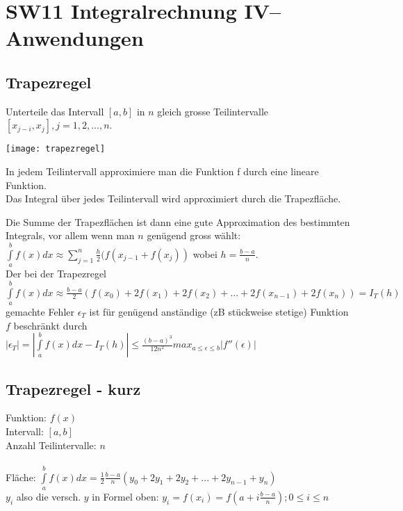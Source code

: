 \documentclass[../main.tex]{subfiles}
\begin{document}
\chapter{SW11 Integralrechnung IV-- Anwendungen}
\section{Trapezregel}
Unterteile das Intervall $[a,b]$ in $n$ gleich grosse Teilintervalle $[x_{j-i},x_j],j=1,2,...,n$.\\
\begin{minipage}{0.45\textwidth}
    \texttt{[image: trapezregel]}
\end{minipage} \hfill
\begin{minipage}{0.5\textwidth}
    In jedem Teilintervall approximiere man die Funktion f durch eine lineare Funktion. \\
    Das Integral über jedes Teilintervall wird approximiert durch die Trapezfläche. 
\end{minipage}
Die Summe der Trapezflächen ist dann eine gute Approximation des bestimmten Integrals, vor allem wenn man $n$ genügend gross wählt: \\
$\int\limits_a^bf(x)dx\approx\sum\limits_{j=1}^n\frac{h}{2}(f(x_{j-1}+f(x_j))$ wobei $h=\frac{b-a}{n}$. \\
Der bei der Trapezregel \\
$\int\limits_a^bf(x)dx\approx\frac{b-a}{2}(f(x_0)+2f(x_1)+2f(x_2)+...+2f(x_{n-1})+2f(x_n)) = I_T(h)$ \\
gemachte Fehler $\epsilon_T$ ist für genügend anständige (zB stückweise stetige) Funktion $f$ beschränkt durch \\
$|\epsilon_T|=|\int\limits_a^bf(x)dx-I_T(h)|\leq\frac{(b-a)^3}{12n^2}max_{a\leq\epsilon\leq b} |f''(\epsilon)|$

\section{Trapezregel - kurz}
Funktion: $f(x)$ \\
Intervall: $[a,b]$ \\
Anzahl Teilintervalle: $n$ \\
\\
Fläche: $\int\limits_a^bf(x)dx=\frac{1}{2}\frac{b-a}{n}(y_0+2y_1+2y_2+...+2y_{n-1}+y_n)$ \\
$y_i$ also die versch. $y$ in Formel oben: $y_i=f(x_i)=f(a+i\frac{b-a}{n});0\leq i\leq n$
\end{document}
